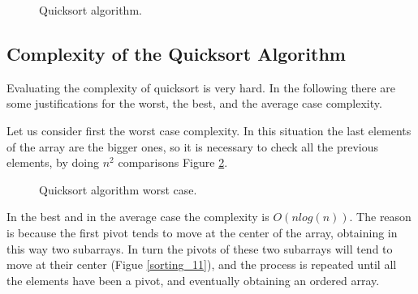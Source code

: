 \begin{figure}[H]

\caption[Quicksort algorithm.]{Quicksort algorithm.}
\label{sorting_8}
\end{figure}

\subsection{Complexity of the Quicksort Algorithm}
Evaluating the complexity of quicksort is very hard. In the following there are some justifications for the worst, the best, and the average case complexity.

Let us consider first the worst case complexity. In this situation the last elements of the array are the bigger ones, so it is necessary to check all the previous elements, by doing \(n^{2}\) comparisons Figure \ref{sorting_10}.

\begin{figure}[H]
\centering
{}

\caption[Quicksort algorithm worst case.]{Quicksort algorithm worst case.}
\label{sorting_10}
\end{figure}

In the best and in the average case the complexity is \(O(n log(n))\). The reason is because the first pivot tends to move at the center of the array, obtaining in this way two subarrays. In turn the pivots of these two subarrays will tend to move at their center (Figue \ref{sorting_11}), and the process is repeated until all the elements have been a pivot, and eventually obtaining an ordered array.

